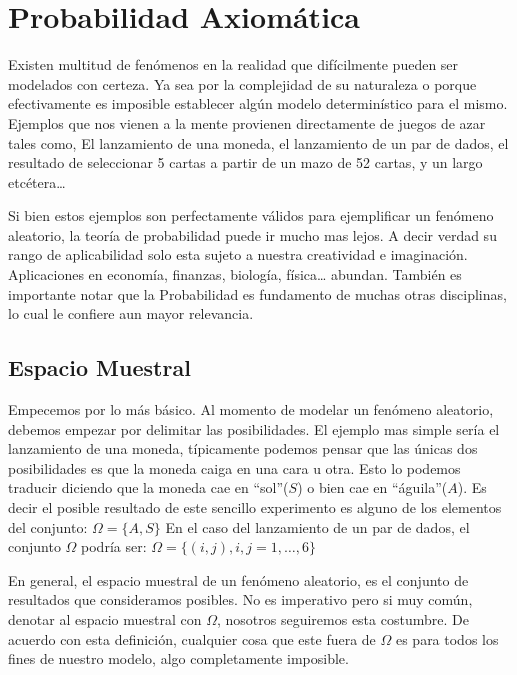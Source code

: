 \documentclass[14pt]{extreport}
\theoremstyle{definicion}
\theoremstyle{propiedad}
\begin{document}
\chapter{Probabilidad Axiomática}


Existen multitud de fenómenos en la realidad que difícilmente pueden ser modelados con certeza. Ya sea por la complejidad de su naturaleza o
porque efectivamente es imposible establecer algún modelo determinístico para el mismo. Ejemplos que nos vienen a la mente provienen directamente
de juegos de azar tales como, El lanzamiento de una moneda, el lanzamiento de un par de dados, el resultado de seleccionar 5 cartas a partir de un mazo de 52 cartas, y un largo etcétera\ldots{}

Si bien estos ejemplos son perfectamente válidos para ejemplificar un fenómeno aleatorio, la teoría de probabilidad puede ir mucho mas lejos. A decir verdad su rango de aplicabilidad solo esta sujeto a nuestra creatividad e imaginación. Aplicaciones en economía, finanzas, biología, física\dots{} abundan. También es importante notar que la Probabilidad es fundamento de muchas otras disciplinas, lo cual le confiere aun mayor relevancia.


\section{Espacio Muestral}

Empecemos por lo más básico. Al momento de modelar un fenómeno aleatorio, debemos empezar por delimitar las posibilidades. El ejemplo mas simple sería el lanzamiento de una moneda, típicamente podemos pensar que las únicas dos posibilidades es que la moneda caiga en una cara u otra. Esto lo podemos traducir diciendo que la moneda cae en ``sol''($S$) o bien cae en ``águila''($A$). Es decir el posible resultado de este sencillo experimento es alguno de los elementos del conjunto: $\Omega = \{A, S\}$ En el caso del lanzamiento de un par de dados, el conjunto $\Omega$ podría ser: $\Omega = \{(i , j), i , j = 1,\ldots , 6\}$

En general, el espacio muestral de un fenómeno aleatorio, es el conjunto de resultados que consideramos posibles. No es imperativo pero si muy común, denotar al espacio muestral con $\Omega$, nosotros seguiremos esta costumbre. De acuerdo con esta definición, cualquier cosa que este fuera de $\Omega$ es para todos los fines de nuestro modelo, algo completamente imposible.
\end{document}
